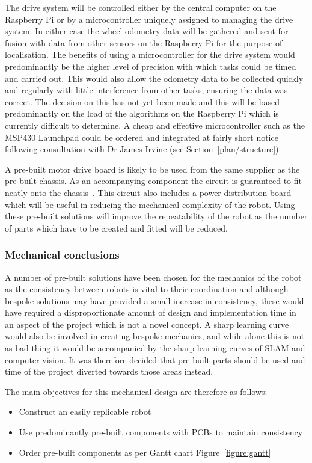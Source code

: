 The drive system will be controlled either by the central computer on
the Raspberry Pi or by a microcontroller uniquely assigned to managing the
drive system. In either case the wheel odometry data will be gathered and
sent for fusion with data from other sensors on the Raspberry Pi for the
purpose of localisation. The benefits of using a microcontroller for the
drive system would predominantly be the higher level of precision with
which tasks could be timed and carried out. This would also allow the
odometry data to be collected quickly and regularly with little
interference from other tasks, ensuring the data was correct. The decision
on this has not yet been made and this will be based predominantly on the
load of the algorithms on the Raspberry Pi which is currently difficult to
determine. A cheap and effective microcontroller such as the MSP430
Launchpad could be ordered and integrated at fairly short notice following consultation with Dr James Irvine (see Section~\ref{plan/structure}).

A pre-built motor drive board is likely to be used from the same supplier as the
pre-built chassis. As an
accompanying component the circuit is guaranteed to fit neatly onto the
chassis~\cite{pololudriver}. This circuit also includes a power distribution board
which will be useful in reducing the mechanical complexity of the robot.
Using these pre-built solutions will improve the repeatability of the
robot as the number of parts which have to be created and fitted will be
reduced.

\subsubsection{Mechanical conclusions}\label{design/mechanical/conclusion}
A number of pre-built solutions have been chosen for the mechanics of the
robot as the consistency between robots is vital to their coordination and
although bespoke solutions may have provided a small increase in
consistency, these would have required a disproportionate amount of design
and implementation time in an aspect of the project which is not a novel
concept. A sharp learning curve would also be involved in creating
bespoke mechanics, and while alone this is not as bad thing it would be
accompanied by the sharp learning curves of SLAM and computer vision. It
was therefore decided that pre-built parts should be used and time of the
project diverted towards those areas instead.

The main objectives for this mechanical design are therefore as follows:
\begin{itemize}
    \item{Construct an easily replicable robot}
    \item{Use predominantly pre-built components with PCBs to maintain consistency}
    \item{Order pre-built components as per Gantt chart Figure~\ref{figure:gantt}}
\end{itemize}


